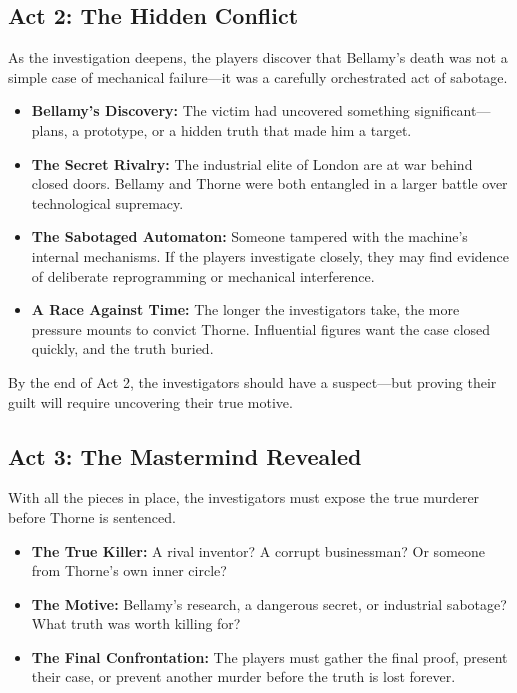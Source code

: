 \subsection{Act 2: The Hidden Conflict}  
As the investigation deepens, the players discover that Bellamy’s death was not a simple case of mechanical failure—it was a carefully orchestrated act of sabotage.

\begin{Example}
    \begin{itemize}
        \item \textbf{Bellamy’s Discovery:} The victim had uncovered something significant—plans, a prototype, or a hidden truth that made him a target.
        \item \textbf{The Secret Rivalry:} The industrial elite of London are at war behind closed doors. Bellamy and Thorne were both entangled in a larger battle over technological supremacy.
        \item \textbf{The Sabotaged Automaton:} Someone tampered with the machine’s internal mechanisms. If the players investigate closely, they may find evidence of deliberate reprogramming or mechanical interference.
        \item \textbf{A Race Against Time:} The longer the investigators take, the more pressure mounts to convict Thorne. Influential figures want the case closed quickly, and the truth buried.
    \end{itemize}
\end{Example}

\noindent
By the end of Act 2, the investigators should have a suspect—but proving their guilt will require uncovering their true motive.

\subsection{Act 3: The Mastermind Revealed}  
With all the pieces in place, the investigators must expose the true murderer before Thorne is sentenced.

\begin{Example}
    \begin{itemize}
        \item \textbf{The True Killer:} A rival inventor? A corrupt businessman? Or someone from Thorne’s own inner circle?
        \item \textbf{The Motive:} Bellamy’s research, a dangerous secret, or industrial sabotage? What truth was worth killing for?
        \item \textbf{The Final Confrontation:} The players must gather the final proof, present their case, or prevent another murder before the truth is lost forever.
    \end{itemize}
\end{Example}

